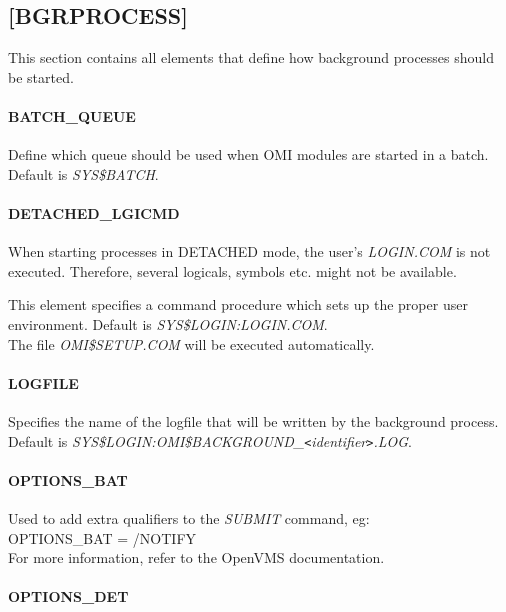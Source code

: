\documentclass[a4paper]{book}
\newcommand{\lt}{\texttt{<}}
\newcommand{\gt}{\texttt{>}}
\renewcommand{\indent}{\hspace*{5mm}}
\begin{document}
\subsection{[BGRPROCESS]}
\label{subsubsec:mylabel19}

This section contains all elements that define how background processes 
should be started.

\paragraph{BATCH{\_}QUEUE}

Define which queue should be used when OMI modules are started in a batch. 
Default is \textsl{SYS{\$}BATCH}.

\paragraph{DETACHED{\_}LGICMD}

When starting processes in DETACHED mode, the user's \textsl{LOGIN.COM} is 
not executed. Therefore, several logicals, symbols etc. might not be 
available.

This element specifies a command procedure which sets up the proper user 
environment. Default is \textsl{SYS{\$}LOGIN:LOGIN.COM}. \\
The file \textsl{OMI{\$}SETUP.COM} will be executed automatically.

\paragraph{LOGFILE}

Specifies the name of the logfile that will be written by the background 
process. Default is 
\textsl{SYS{\$}LOGIN:OMI{\$}BACKGROUND{\_}\textit{\lt identifier\gt }.LOG}.

\paragraph{OPTIONS{\_}BAT}

Used to add extra qualifiers to the \textsl{SUBMIT} command, eg:\\
\indent\textsf{OPTIONS{\_}BAT = /NOTIFY} \\
For more information, refer to the OpenVMS documentation.

\paragraph{OPTIONS{\_}DET}
\end{document}
